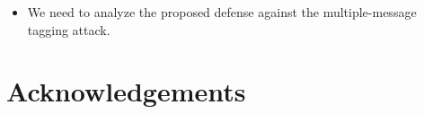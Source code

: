 \documentclass{llncs}
\begin{document}
\begin{itemize}
\item We need to analyze the proposed defense against the multiple-message
tagging attack.
\end{itemize}




\section*{Acknowledgements}





\end{document}
